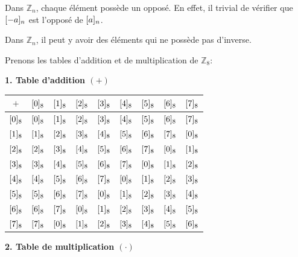\begin{remarques}
	\item Dans $\mathbb{Z}_n$, chaque élément possède un opposé. En effet, il trivial de vérifier que $\cl{-a}$ est l'opposé de $\cl{a}$.
	
	\item Dans $\mathbb{Z}_n$, il peut y avoir des éléments qui ne possède pas d'inverse.
	
\end{remarques}

\pagebreak

\begin{exemple}
	Prenons les tables d'addition et de multiplication de $\mathbb{Z}_8$:
	\begin{minipage}[t]{0.45\linewidth}
		\vspace{0pt} %
		\centering
		\textbf{1. Table d'addition $(+)$}
		\vspace{0.3cm}
		
		\renewcommand{\arraystretch}{1.2}
		\setlength{\tabcolsep}{3pt}
		\footnotesize 
		\begin{tabular}{c|cccccccc}
			$+$ & $\cl[8]{0}$ & $\cl[8]{1}$ & $\cl[8]{2}$ & $\cl[8]{3}$ & $\cl[8]{4}$ & $\cl[8]{5}$ & $\cl[8]{6}$ & $\cl[8]{7}$ \\ \hline
			$\cl[8]{0}$ & $\cl[8]{0}$ & $\cl[8]{1}$ & $\cl[8]{2}$ & $\cl[8]{3}$ & $\cl[8]{4}$ & $\cl[8]{5}$ & $\cl[8]{6}$ & $\cl[8]{7}$ \\
			$\cl[8]{1}$ & $\cl[8]{1}$ & $\cl[8]{2}$ & $\cl[8]{3}$ & $\cl[8]{4}$ & $\cl[8]{5}$ & $\cl[8]{6}$ & $\cl[8]{7}$ & $\cl[8]{0}$ \\
			$\cl[8]{2}$ & $\cl[8]{2}$ & $\cl[8]{3}$ & $\cl[8]{4}$ & $\cl[8]{5}$ & $\cl[8]{6}$ & $\cl[8]{7}$ & $\cl[8]{0}$ & $\cl[8]{1}$ \\
			$\cl[8]{3}$ & $\cl[8]{3}$ & $\cl[8]{4}$ & $\cl[8]{5}$ & $\cl[8]{6}$ & $\cl[8]{7}$ & $\cl[8]{0}$ & $\cl[8]{1}$ & $\cl[8]{2}$ \\
			$\cl[8]{4}$ & $\cl[8]{4}$ & $\cl[8]{5}$ & $\cl[8]{6}$ & $\cl[8]{7}$ & $\cl[8]{0}$ & $\cl[8]{1}$ & $\cl[8]{2}$ & $\cl[8]{3}$ \\
			$\cl[8]{5}$ & $\cl[8]{5}$ & $\cl[8]{6}$ & $\cl[8]{7}$ & $\cl[8]{0}$ & $\cl[8]{1}$ & $\cl[8]{2}$ & $\cl[8]{3}$ & $\cl[8]{4}$ \\
			$\cl[8]{6}$ & $\cl[8]{6}$ & $\cl[8]{7}$ & $\cl[8]{0}$ & $\cl[8]{1}$ & $\cl[8]{2}$ & $\cl[8]{3}$ & $\cl[8]{4}$ & $\cl[8]{5}$ \\
			$\cl[8]{7}$ & $\cl[8]{7}$ & $\cl[8]{0}$ & $\cl[8]{1}$ & $\cl[8]{2}$ & $\cl[8]{3}$ & $\cl[8]{4}$ & $\cl[8]{5}$ & $\cl[8]{6}$ \\
		\end{tabular}
	\end{minipage}%
	\hfill
	\begin{minipage}[t]{0.45\linewidth}
		\vspace{0pt} %
		\centering
		\textbf{2. Table de multiplication $(\cdot)$}
		\vspace{0.3cm}
		

\end{minipage}
\end{exemple}
